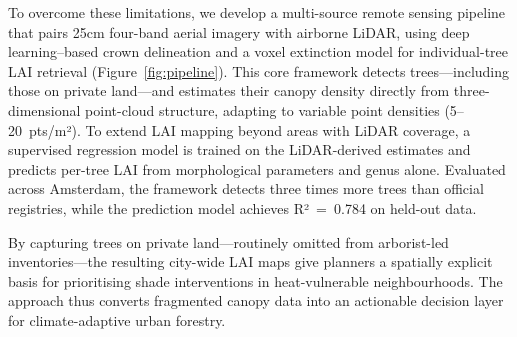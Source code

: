 To overcome these limitations, we develop a multi-source remote sensing pipeline that pairs 25cm four-band aerial imagery with airborne LiDAR, using deep learning--based crown delineation and a voxel extinction model for individual-tree LAI retrieval (Figure~\ref{fig:pipeline}). This core framework detects trees---including those on private land---and estimates their canopy density directly from three-dimensional point-cloud structure, adapting to variable point densities (5--20~pts/m²). To extend LAI mapping beyond areas with LiDAR coverage, a supervised regression model is trained on the LiDAR-derived estimates and predicts per-tree LAI from morphological parameters and genus alone. Evaluated across Amsterdam, the framework detects three times more trees than official registries, while the prediction model achieves R²~=~0.784 on held-out data.

By capturing trees on private land---routinely omitted from arborist-led inventories---the resulting city-wide LAI maps give planners a spatially explicit basis for prioritising shade interventions in heat-vulnerable neighbourhoods. The approach thus converts fragmented canopy data into an actionable decision layer for climate-adaptive urban forestry.
